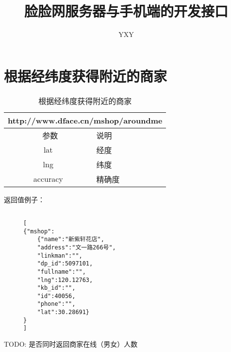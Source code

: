 \documentclass[cs4size]{ctexartutf8}
\author{YXY}
\title{脸脸网服务器与手机端的开发接口}
\begin{document}
 

\maketitle
\tableofcontents


\section{根据经纬度获得附近的商家}

\begin{table}[H]
   \begin{center}
\begin{tabular}{|c|p{12cm}|}
\hline
\multicolumn{2}{|c|}{http://www.dface.cn/mshop/aroundme} \\
\hline\hline
 \  参数  &  说明  \\
\hline
 lat  &  经度\\
\hline
 lng  &  纬度\\ 
\hline
 accuracy  &  精确度\\ 
\hline
\end{tabular}
\caption{根据经纬度获得附近的商家}
   \end{center}
\end{table}


返回值例子：

\begin{figure}[H]
\begin{verbatim}

[
{"mshop":
	{"name":"新紫轩花店",
	"address":"文一路266号",
	"linkman":"",
	"dp_id":5097101,
	"fullname":"",
	"lng":120.12763,
	"kb_id":"",
	"id":40056,
	"phone":"",
	"lat":30.28691}
}
]

\end{verbatim}
\end{figure}
     

TODO: 是否同时返回商家在线（男女）人数

\newpage
\end{document}
